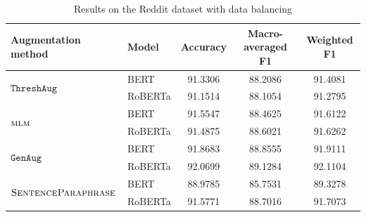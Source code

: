 \documentclass[11pt,a4paper]{article}
\newcommand{\senttfpara}{$\textsc{SentenceParaphrase}$}
\newcommand{\mlm}{$\textsc{mlm}$}
\newcommand{\genaug}{$\texttt{GenAug}$}
\newcommand{\threshaug}{$\texttt{ThreshAug}$}
\begin{document}
\begin{table}[]
    \small
    \centering
    \begin{tabular}{llccc}
        \toprule
        \textbf{Augmentation method} & \textbf{Model} & \textbf{Accuracy} & \textbf{Macro-averaged F1} & \textbf{Weighted F1} \\
        \midrule
        \multirow{2}{*}{\threshaug} & BERT & 91.3306 & 88.2086 & 91.4081 \\
         & RoBERTa & 91.1514 & 88.1054 & 91.2795 \\\midrule
        
        \multirow{2}{*}{\mlm} & BERT & 91.5547 & 88.4625 & 91.6122 \\
         & RoBERTa & 91.4875 & 88.6021 & 91.6262 \\\midrule
        
        \multirow{2}{*}{\genaug} & BERT & 91.8683 & 88.8555 & 91.9111 \\
         & RoBERTa & 92.0699 & 89.1284 & 92.1104 \\\midrule
        
        \multirow{2}{*}{\senttfpara} & BERT & 88.9785 & 85.7531 & 89.3278 \\
         & RoBERTa & 91.5771 & 88.7016 & 91.7073 \\
        \bottomrule
    \end{tabular}
    \caption{Results on the Reddit dataset with data balancing}
    \label{tab:reddit15k}
\end{table}

\end{document}
